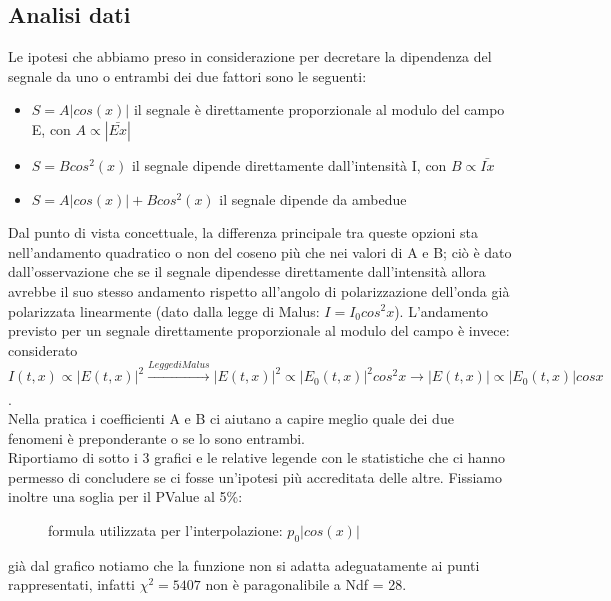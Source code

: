 \documentclass{article}
\theoremstyle{definition}
\begin{document}
\subsection{Analisi dati}
Le ipotesi che abbiamo preso in considerazione per decretare la dipendenza del segnale da uno o entrambi dei due fattori sono le seguenti:
\begin{itemize}
    \item \(S = A \left|cos(x) \right|\) il segnale è direttamente proporzionale al modulo del campo E, con \(A \propto \left| \bar{Ex}\right|\)
    \item \(S = B cos^{2}(x) \) il segnale dipende direttamente dall'intensità I, con \(B \propto \bar{Ix}\)
    \item \(S = A \left|cos(x)\right| + B cos^{2}(x) \) il segnale dipende da ambedue
\end{itemize}

\noindent Dal punto di vista concettuale, la differenza principale tra queste opzioni sta nell'andamento quadratico o non del coseno più che nei valori di A e B; ciò è dato dall'osservazione che se il segnale dipendesse direttamente dall'intensità allora avrebbe il suo stesso andamento rispetto all'angolo di polarizzazione dell'onda già polarizzata linearmente (dato dalla legge di Malus: \(I = I_{0}cos^{2}x\)). L'andamento previsto per un segnale direttamente proporzionale al modulo del campo è invece:  considerato \(I(t, x) \propto \left | E(t, x) \right |^{2} \xrightarrow[]{Legge di Malus} \left | E(t, x) \right |^{2} \propto \left | E_{0}(t, x) \right |^{2} cos^{2}x \rightarrow \left | E(t, x) \right | \propto \left | E_{0}(t, x) \right | cosx\).\\
Nella pratica i coefficienti A e B ci aiutano a capire meglio quale dei due fenomeni è preponderante o se lo sono entrambi.\\


\noindent Riportiamo di sotto i 3 grafici e le relative legende con le statistiche che ci hanno permesso di concludere se ci fosse un'ipotesi più accreditata delle altre. Fissiamo inoltre una soglia per il PValue al 5\%:

\begin{figure}[!ht]
    	\captionsetup{labelformat=empty}

	\caption{formula utilizzata per l'interpolazione: \(p_{0}\left| cos(x) \right|\)}
\end{figure}
già dal grafico notiamo che la funzione non si adatta adeguatamente ai punti rappresentati, infatti \(\chi^{2} = 5407\) non è paragonalibile a  Ndf = 28.\\
\end{document}
